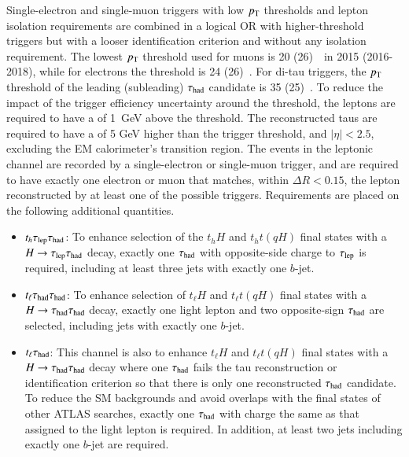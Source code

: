 Single-electron and single-muon triggers with low $p_{\text{T}}$ thresholds and lepton isolation requirements are combined in a logical OR 
with higher-threshold triggers but with a looser identification criterion and without any isolation requirement.
The lowest $p_{\text{T}}$ threshold used for muons is 20 (26)~\gev\ in 2015 (2016-2018), while for electrons the threshold is 24 (26)~\gev.
For di-tau triggers, the $p_{\text{T}}$ threshold of the leading (subleading) $\tau_{\mathrm{had}}$ candidate is 35 (25)~\gev.
To reduce the impact of the trigger efficiency uncertainty around the threshold, the leptons are required to have a \pt of 1~GeV above the threshold. 
The reconstructed taus are required to have a \pt of 5 GeV higher than the trigger threshold, and $|\eta|<2.5$, excluding the EM calorimeter's transition region.
The events in the leptonic channel are recorded by a single-electron or single-muon trigger, and are required to have exactly one electron or muon that matches, within $\Delta R < 0.15$, the lepton reconstructed by at least one of the possible triggers. Requirements are placed on the following additional quantities.
\begin{itemize}
\item $t_h\tau_{\mathrm{lep}} \tau_{\mathrm{had}}$: To enhance selection of the $t_hH$ and $t_ht(qH)$ final states with a $H\rightarrow\tau_{\mathrm{lep}} \tau_{\mathrm{had}}$ decay, exactly one $\tau_{\mathrm{had}}$ with opposite-side charge to $\tau_{\mathrm{lep}}$ is required, including at least three jets with exactly one $b$-jet.
\item $t_{\ell}\tau_{\mathrm{had}} \tau_{\mathrm{had}}$: To enhance selection of $t_{\ell}H$ and $t_{\ell}t(qH)$ final states with a $H\rightarrow\tau_{\mathrm{had}} \tau_{\mathrm{had}}$ decay, exactly one light lepton and two opposite-sign $\tau_{\mathrm{had}}$ are selected,
  including jets with exactly one $b$-jet.
\item $t_{\ell}\tau_{\mathrm{had}}$: This channel is also to enhance $t_{\ell}H$ and $t_{\ell}t(qH)$ final states with a $H\rightarrow\tau_{\mathrm{had}} \tau_{\mathrm{had}}$ decay where one $\tau_{\mathrm{had}}$ fails the tau reconstruction or identification
  criterion so that there is only one reconstructed $\tau_{\mathrm{had}}$ candidate.
  To reduce the SM backgrounds and avoid overlaps with the final states of other ATLAS searches, exactly one $\tau_{\mathrm{had}}$ with charge the same as that assigned to the light lepton is required.
  In addition, at least two jets including exactly one $b$-jet are required.
\end{itemize}

